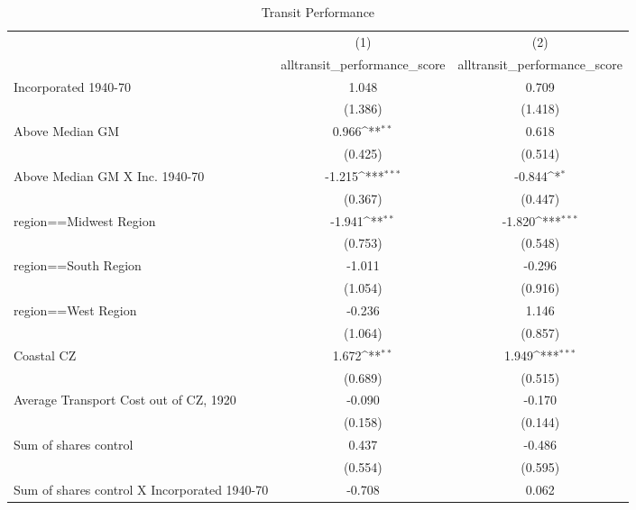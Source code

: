\begin{table}[htbp]\centering
\def\sym#1{\ifmmode^{#1}\else\(^{#1}\)\fi}
\caption{Transit Performance}
\begin{tabular}{l*{2}{c}}
\hline\hline
                    &\multicolumn{1}{c}{(1)}&\multicolumn{1}{c}{(2)}\\
                    &\multicolumn{1}{c}{alltransit\_performance\_score}&\multicolumn{1}{c}{alltransit\_performance\_score}\\
\hline
Incorporated 1940-70&       1.048         &       0.709         \\
                    &     (1.386)         &     (1.418)         \\
[1em]
Above Median GM     &       0.966\sym{**} &       0.618         \\
                    &     (0.425)         &     (0.514)         \\
[1em]
Above Median GM X Inc. 1940-70&      -1.215\sym{***}&      -0.844\sym{*}  \\
                    &     (0.367)         &     (0.447)         \\
[1em]
region==Midwest Region&      -1.941\sym{**} &      -1.820\sym{***}\\
                    &     (0.753)         &     (0.548)         \\
[1em]
region==South Region&      -1.011         &      -0.296         \\
                    &     (1.054)         &     (0.916)         \\
[1em]
region==West Region &      -0.236         &       1.146         \\
                    &     (1.064)         &     (0.857)         \\
[1em]
Coastal CZ          &       1.672\sym{**} &       1.949\sym{***}\\
                    &     (0.689)         &     (0.515)         \\
[1em]
Average Transport Cost out of CZ, 1920&      -0.090         &      -0.170         \\
                    &     (0.158)         &     (0.144)         \\
[1em]
Sum of shares control&       0.437         &      -0.486         \\
                    &     (0.554)         &     (0.595)         \\
[1em]
Sum of shares control X Incorporated 1940-70&      -0.708         &       0.062         \\

\end{tabular}
\end{table}
